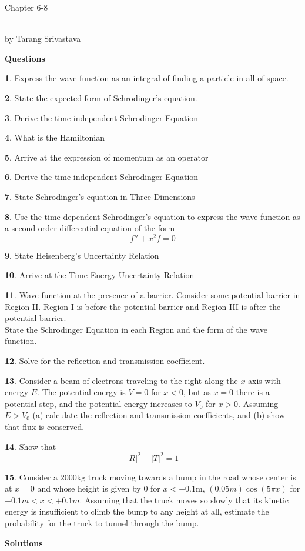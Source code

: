 \documentclass[11pt, twocolumn]{article}
\author{Tarang Srivastava}
\newcommand{\makechaptertitle}[1]{
\begin{center}
	\begin{large}
		#1
	\end{large}
	\begin{small}
		\\by Tarang Srivastava
	\end{small}
\end{center}
}
\theoremstyle{definition}
\newtheorem{q}{}
\begin{document}
	\makechaptertitle{Chapter 6-8}
	\textbf{Questions}
	\begin{q}
		Express the wave function as an integral of finding a particle in all of space.
	\end{q}
	\begin{q}
		State the expected form of Schrodinger's equation.
	\end{q}
	\begin{q}
		Derive the time independent Schrodinger Equation
	\end{q}
	\begin{q}
		What is the Hamiltonian
	\end{q}
	\begin{q}
		Arrive at the expression of momentum as an operator
	\end{q}
	\begin{q}
		Derive the time independent Schrodinger Equation
	\end{q}
	\begin{q}
		State Schrodinger's equation in Three Dimensions
	\end{q}
	\begin{q}
		Use the time dependent Schrodinger's equation to express the wave function as a second order differential equation of the form 
		\[ f'' + x^2f = 0 \]
	\end{q}
	\begin{q}
		State Heisenberg's Uncertainty Relation
	\end{q}
	\begin{q}
		Arrive at the Time-Energy Uncertainty Relation
	\end{q}
	\begin{q}
		Wave function at the presence of a barrier. Consider some potential barrier in Region II. Region I is before the potential barrier and Region III is after the potential barrier.\\
		State the Schrodinger Equation in each Region and the form of the wave function.
	\end{q}
	\begin{q}
		Solve for the reflection and transmission coefficient.
	\end{q}
	\begin{q}
		Consider a beam of electrons traveling to the right along the $ x$-axis with energy $ E $. The potential energy is $ V = 0 $ for $ x < 0 $, but as $ x = 0 $ there is a potential step, and the potential energy increases to $ V_0 $ for $ x > 0 $. Assuming $ E > V_0 $ (a) calculate the reflection and transmission coefficients, and (b) show that flux is conserved. 
	\end{q}
	\begin{q}
		Show that 
		\[ |R|^2 + |T|^2 = 1 \]
	\end{q}
	\begin{q}
		Consider a $ 2000 $kg truck moving towards a bump in the road whose center is at $ x = 0 $ and whose height is given by $ 0 $ for $ x<-0.1 $m, $ (0.05m)\cos(5 \pi x)  $ for $ -0.1m < x < +0.1m $. Assuming that the truck moves so slowly that its kinetic energy is insufficient to climb the bump to any height at all, estimate the probability for the truck to tunnel through the bump.
	\end{q}
	\pagebreak
	\textbf{Solutions}
	
\end{document}
